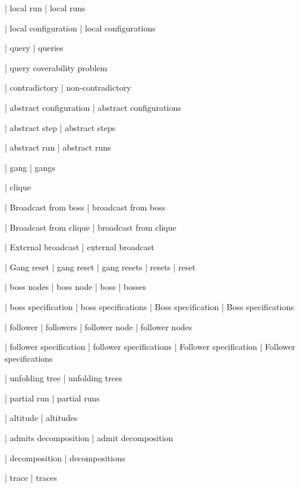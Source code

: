 | local run
| local runs

| local configuration
| local configurations

| query
| queries

| query coverability problem

| contradictory
| non-contradictory

| abstract configuration
| abstract configurations

| abstract step
| abstract steps


| abstract run
| abstract runs


| gang
| gangs

| clique

| Broadcast from boss
| broadcast from boss

| Broadcast from clique
| broadcast from clique

| External broadcast
| external broadcast

| Gang reset
| gang reset
| gang resets
| resets
| reset


| boss nodes
| boss node
| boss
| bosses

| boss specification
| boss specifications
| Boss specification
| Boss specifications


| follower
| followers
| follower node
| follower nodes

| follower specification
| follower specifications
| Follower specification
| Follower specifications

| unfolding tree
| unfolding trees
%

| partial run
| partial runs

| altitude
| altitudes

| admits decomposition
| admit decomposition

| decomposition
| decompositions

| trace
| traces

